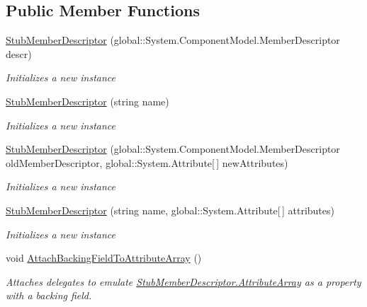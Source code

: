 \subsection*{Public Member Functions}
\begin{DoxyCompactItemize}
\item 
\hyperlink{class_system_1_1_component_model_1_1_fakes_1_1_stub_member_descriptor_a21741fa09f589ab7bdaeaca8a49c5bbd}{Stub\-Member\-Descriptor} (global\-::\-System.\-Component\-Model.\-Member\-Descriptor descr)
\begin{DoxyCompactList}\small\item\em Initializes a new instance\end{DoxyCompactList}\item 
\hyperlink{class_system_1_1_component_model_1_1_fakes_1_1_stub_member_descriptor_ab53868e0179a11948596bca982df54d7}{Stub\-Member\-Descriptor} (string name)
\begin{DoxyCompactList}\small\item\em Initializes a new instance\end{DoxyCompactList}\item 
\hyperlink{class_system_1_1_component_model_1_1_fakes_1_1_stub_member_descriptor_a62f381620b32ed9644ead78df03df572}{Stub\-Member\-Descriptor} (global\-::\-System.\-Component\-Model.\-Member\-Descriptor old\-Member\-Descriptor, global\-::\-System.\-Attribute\mbox{[}$\,$\mbox{]} new\-Attributes)
\begin{DoxyCompactList}\small\item\em Initializes a new instance\end{DoxyCompactList}\item 
\hyperlink{class_system_1_1_component_model_1_1_fakes_1_1_stub_member_descriptor_a3e8f4bed45b84c5e63ac59f296cb3176}{Stub\-Member\-Descriptor} (string name, global\-::\-System.\-Attribute\mbox{[}$\,$\mbox{]} attributes)
\begin{DoxyCompactList}\small\item\em Initializes a new instance\end{DoxyCompactList}\item 
void \hyperlink{class_system_1_1_component_model_1_1_fakes_1_1_stub_member_descriptor_a8401e40a555832368a54a85b4466f8ad}{Attach\-Backing\-Field\-To\-Attribute\-Array} ()
\begin{DoxyCompactList}\small\item\em Attaches delegates to emulate \hyperlink{class_system_1_1_component_model_1_1_fakes_1_1_stub_member_descriptor_a67a8fb481380e0b1136cdb2bc61874b2}{Stub\-Member\-Descriptor.\-Attribute\-Array} as a property with a backing field.\end{DoxyCompactList}\item 

\end{DoxyCompactItemize}
